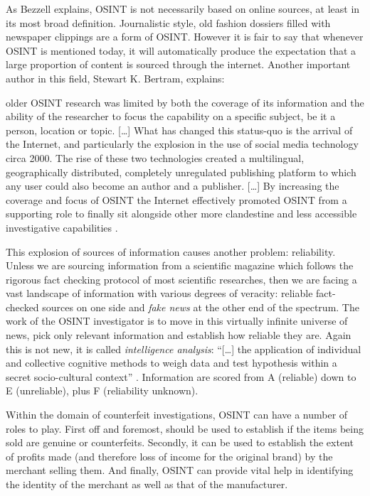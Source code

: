 As Bezzell explains, OSINT is not necessarily based on online sources, at least
in its most broad definition. Journalistic style, old fashion dossiers filled
with newspaper clippings are a form of OSINT. However it is fair to say that
whenever OSINT is mentioned today, it will automatically produce the expectation
that a large proportion of content is sourced through the internet. Another
important author in this field, Stewart K. Bertram, explains:
\begin{displayquote}
older OSINT research was limited by both the coverage of its information and the
ability of the researcher to focus the capability on a specific subject, be it
a person, location or topic. [\ldots] What has changed this status-quo is the
arrival of the Internet, and particularly the explosion in the use of social
media technology circa 2000. The rise of these two technologies created a
multilingual, geographically distributed, completely unregulated publishing
platform to which any user could also become an author and a publisher. [\ldots]
By increasing the coverage and focus of OSINT the Internet effectively promoted
OSINT from a supporting role to finally sit alongside other more clandestine and
less accessible investigative capabilities \cite{SB15}.
\end{displayquote}

This explosion of sources of information causes another problem: reliability.
Unless we are sourcing information from a scientific magazine which
follows the rigorous fact checking protocol of most scientific researches, then
we are facing a vast landscape of information with various degrees of
veracity: reliable fact-checked sources on one side and \emph{fake news} at
the other end of the spectrum. The work of the OSINT investigator is to move in
this virtually infinite universe of news, pick only relevant information and
establish how reliable they are. Again this is not new, it is called
\emph{intelligence analysis}: ``[\ldots] the application of individual and
collective cognitive methods to weigh data and test hypothesis within a secret
socio-cultural context'' \cite{JH07}. Information
are scored from A (reliable) down to E (unreliable), plus F (reliability
unknown).

Within the domain of counterfeit investigations, OSINT can have a number of
roles to play. First off and foremost, should be used to establish if the items
being sold are genuine or counterfeits. Secondly, it can be used to establish
the extent of profits made (and therefore loss of income for the original brand)
by the merchant selling them. And finally, OSINT can provide vital help in
identifying the identity of the merchant as well as that of the manufacturer.


